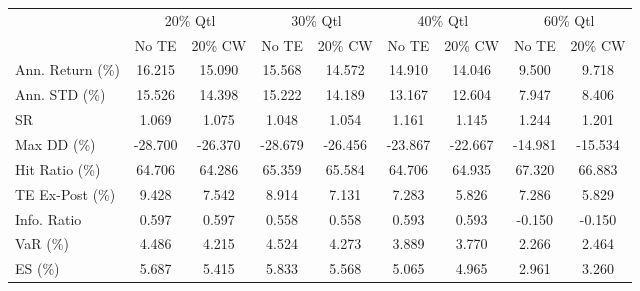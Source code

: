 \begin{tabular}{lcccccccc}
\toprule
{} & \multicolumn{2}{c}{20\% Qtl} & \multicolumn{2}{c}{30\% Qtl} & \multicolumn{2}{c}{40\% Qtl} & \multicolumn{2}{c}{60\% Qtl} \\
{} &   No TE &  20\% CW &   No TE &  20\% CW &   No TE &  20\% CW &   No TE &  20\% CW \\
\midrule
Ann. Return (\%) &  16.215 &  15.090 &  15.568 &  14.572 &  14.910 &  14.046 &   9.500 &   9.718 \\
Ann. STD (\%)    &  15.526 &  14.398 &  15.222 &  14.189 &  13.167 &  12.604 &   7.947 &   8.406 \\
SR              &   1.069 &   1.075 &   1.048 &   1.054 &   1.161 &   1.145 &   1.244 &   1.201 \\
Max DD (\%)      & -28.700 & -26.370 & -28.679 & -26.456 & -23.867 & -22.667 & -14.981 & -15.534 \\
Hit Ratio (\%)   &  64.706 &  64.286 &  65.359 &  65.584 &  64.706 &  64.935 &  67.320 &  66.883 \\
TE Ex-Post (\%)  &   9.428 &   7.542 &   8.914 &   7.131 &   7.283 &   5.826 &   7.286 &   5.829 \\
Info. Ratio     &   0.597 &   0.597 &   0.558 &   0.558 &   0.593 &   0.593 &  -0.150 &  -0.150 \\
VaR (\%)         &   4.486 &   4.215 &   4.524 &   4.273 &   3.889 &   3.770 &   2.266 &   2.464 \\
ES (\%)          &   5.687 &   5.415 &   5.833 &   5.568 &   5.065 &   4.965 &   2.961 &   3.260 \\
\bottomrule
\end{tabular}
